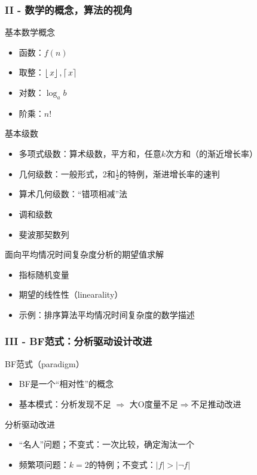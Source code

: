 \subsubsection{II - 数学的概念，算法的视角}

\nid 基本数学概念
\begin{itemize}
    \item 函数：$f(n)$
    \item 取整：$\left \lfloor\,x \right \rfloor, \left \lceil\,x \right \rceil$
    \item 对数：$\log_a b$
    \item 阶乘：$n!$
\end{itemize}

\nid 基本级数
\begin{itemize}
    \item 多项式级数：算术级数，平方和，任意$k$次方和（的渐近增长率）
    \item 几何级数：一般形式，2和$\frac{1}{2}$的特例，渐进增长率的速判
    \item 算术几何级数：“错项相减”法
    \item 调和级数
    \item 斐波那契数列
\end{itemize}

\nid 面向平均情况时间复杂度分析的期望值求解
\begin{itemize}
    \item 指标随机变量
    \item 期望的线性性（linearality）
    \item 示例：排序算法平均情况时间复杂度的数学描述
\end{itemize}

\subsubsection{III - BF范式：分析驱动设计改进}

\nid BF范式（paradigm）
\begin{itemize}
    \item BF是一个“相对性”的概念
    \item 基本模式：分析发现不足 $\Rightarrow$ 大O度量不足$\Rightarrow$不足推动改进
\end{itemize}


\nid 分析驱动改进
\begin{itemize}
    \item “名人”问题；不变式：一次比较，确定淘汰一个
    \item 频繁项问题：$k=2$的特例；不变式：$|f| > |\neg f|$
\end{itemize}
